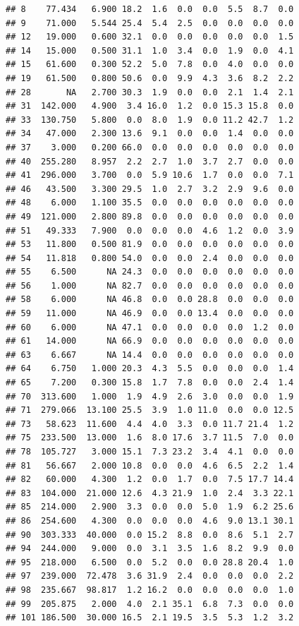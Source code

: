\documentclass[]{report}
\begin{document}
\begin{verbatim}
## 8    77.434   6.900 18.2  1.6  0.0  0.0  5.5  8.7  0.0
## 9    71.000   5.544 25.4  5.4  2.5  0.0  0.0  0.0  0.0
## 12   19.000   0.600 32.1  0.0  0.0  0.0  0.0  0.0  1.5
## 14   15.000   0.500 31.1  1.0  3.4  0.0  1.9  0.0  4.1
## 15   61.600   0.300 52.2  5.0  7.8  0.0  4.0  0.0  0.0
## 19   61.500   0.800 50.6  0.0  9.9  4.3  3.6  8.2  2.2
## 28       NA   2.700 30.3  1.9  0.0  0.0  2.1  1.4  2.1
## 31  142.000   4.900  3.4 16.0  1.2  0.0 15.3 15.8  0.0
## 33  130.750   5.800  0.0  8.0  1.9  0.0 11.2 42.7  1.2
## 34   47.000   2.300 13.6  9.1  0.0  0.0  1.4  0.0  0.0
## 37    3.000   0.200 66.0  0.0  0.0  0.0  0.0  0.0  0.0
## 40  255.280   8.957  2.2  2.7  1.0  3.7  2.7  0.0  0.0
## 41  296.000   3.700  0.0  5.9 10.6  1.7  0.0  0.0  7.1
## 46   43.500   3.300 29.5  1.0  2.7  3.2  2.9  9.6  0.0
## 48    6.000   1.100 35.5  0.0  0.0  0.0  0.0  0.0  0.0
## 49  121.000   2.800 89.8  0.0  0.0  0.0  0.0  0.0  0.0
## 51   49.333   7.900  0.0  0.0  0.0  4.6  1.2  0.0  3.9
## 53   11.800   0.500 81.9  0.0  0.0  0.0  0.0  0.0  0.0
## 54   11.818   0.800 54.0  0.0  0.0  2.4  0.0  0.0  0.0
## 55    6.500      NA 24.3  0.0  0.0  0.0  0.0  0.0  0.0
## 56    1.000      NA 82.7  0.0  0.0  0.0  0.0  0.0  0.0
## 58    6.000      NA 46.8  0.0  0.0 28.8  0.0  0.0  0.0
## 59   11.000      NA 46.9  0.0  0.0 13.4  0.0  0.0  0.0
## 60    6.000      NA 47.1  0.0  0.0  0.0  0.0  1.2  0.0
## 61   14.000      NA 66.9  0.0  0.0  0.0  0.0  0.0  0.0
## 63    6.667      NA 14.4  0.0  0.0  0.0  0.0  0.0  0.0
## 64    6.750   1.000 20.3  4.3  5.5  0.0  0.0  0.0  1.4
## 65    7.200   0.300 15.8  1.7  7.8  0.0  0.0  2.4  1.4
## 70  313.600   1.000  1.9  4.9  2.6  3.0  0.0  0.0  1.9
## 71  279.066  13.100 25.5  3.9  1.0 11.0  0.0  0.0 12.5
## 73   58.623  11.600  4.4  4.0  3.3  0.0 11.7 21.4  1.2
## 75  233.500  13.000  1.6  8.0 17.6  3.7 11.5  7.0  0.0
## 78  105.727   3.000 15.1  7.3 23.2  3.4  4.1  0.0  0.0
## 81   56.667   2.000 10.8  0.0  0.0  4.6  6.5  2.2  1.4
## 82   60.000   4.300  1.2  0.0  1.7  0.0  7.5 17.7 14.4
## 83  104.000  21.000 12.6  4.3 21.9  1.0  2.4  3.3 22.1
## 85  214.000   2.900  3.3  0.0  0.0  5.0  1.9  6.2 25.6
## 86  254.600   4.300  0.0  0.0  0.0  4.6  9.0 13.1 30.1
## 90  303.333  40.000  0.0 15.2  8.8  0.0  8.6  5.1  2.7
## 94  244.000   9.000  0.0  3.1  3.5  1.6  8.2  9.9  0.0
## 95  218.000   6.500  0.0  5.2  0.0  0.0 28.8 20.4  1.0
## 97  239.000  72.478  3.6 31.9  2.4  0.0  0.0  0.0  2.2
## 98  235.667  98.817  1.2 16.2  0.0  0.0  0.0  0.0  1.0
## 99  205.875   2.000  4.0  2.1 35.1  6.8  7.3  0.0  0.0
## 101 186.500  30.000 16.5  2.1 19.5  3.5  5.3  1.2  3.2

\end{verbatim}
\end{document}
